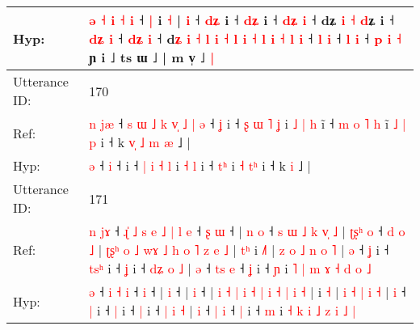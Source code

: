 \documentclass[10pt]{article}
\DeclareRobustCommand{\hl}[1]{{\textcolor{red}{#1}}}
\begin{document}
\begin{longtable}{ll}
 \\
Hyp: & \hl{}\hl{}\hl{}\hl{}\hl{}\hl{}\hl{}\hl{}\hl{ə} \hl{˧} \hl{i} \hl{˧} \hl{i} ˧ \hl{|} i \hl{˧} |\hl{}\hl{} \hl{i} ˧ \hl{}\hl{d}\hl{ʑ} i ˧ \hl{d}\hl{ʑ} i\hl{} ˧ \hl{}\hl{d}\hl{ʑ} \hl{i} ˧ dʑ\hl{}\hl{}\hl{}\hl{} \hl{i} \hl{˧} \hl{}\hl{d}ʑ i\hl{}\hl{}\hl{}\hl{} ˧ \hl{d}\hl{ʑ} \hl{}\hl{i} ˧\hl{}\hl{}\hl{}\hl{}\hl{}\hl{}\hl{} \hl{}\hl{d}\hl{ʑ} \hl{i} ˧ d\hl{}\hl{ʑ} \hl{i} \hl{}\hl{}\hl{˧} \hl{l} \hl{i} \hl{˧} \hl{l} \hl{i} \hl{}\hl{˧} \hl{l} \hl{i} \hl{˧} \hl{l} \hl{i} ˧\hl{}\hl{} \hl{l} \hl{i} ˧ \hl{}\hl{l} \hl{i} ˧ \hl{}\hl{p} \hl{i} \hl{˧} ɲ i ˩ ts ɯ ˩ | m v̩ ˩\hl{ }\hl{|}
 \\
\midrule
Utterance ID: & 170 \\
Ref: & \hl{n}\hl{ }\hl{j}\hl{æ} ˧\hl{ }\hl{s}\hl{ }\hl{ɯ}\hl{ }\hl{˩}\hl{ }\hl{k}\hl{ }\hl{v}\hl{̩}\hl{ }\hl{˩}\hl{ }\hl{|} \hl{ə} ˧\hl{ }\hl{ʝ} i ˧ \hl{ʂ} \hl{ɯ} \hl{˥} \hl{ʝ} i\hl{ }\hl{˩} \hl{|} \hl{h} i\hl{̃} ˧\hl{ }\hl{m}\hl{ }\hl{o} \hl{˥}\hl{ }\hl{h} i\hl{̃} \hl{˩} \hl{|}\hl{ }\hl{p} i ˧ k\hl{ }\hl{v}\hl{̩}\hl{ }\hl{˩}\hl{ }\hl{m} \hl{æ} ˩ |
 \\
Hyp: & \hl{}\hl{}\hl{}\hl{ə} ˧\hl{}\hl{}\hl{}\hl{}\hl{}\hl{}\hl{}\hl{}\hl{}\hl{}\hl{}\hl{}\hl{}\hl{}\hl{} \hl{i} ˧\hl{}\hl{} i ˧ \hl{|} \hl{i} \hl{˧} \hl{l} i\hl{}\hl{} \hl{˧} \hl{l} i\hl{} ˧\hl{}\hl{}\hl{}\hl{} \hl{}\hl{t}\hl{ʰ} i\hl{} \hl{˧} \hl{}\hl{t}\hl{ʰ} i ˧ k\hl{}\hl{}\hl{}\hl{}\hl{}\hl{}\hl{} \hl{i} ˩ |
 \\
\midrule
Utterance ID: & 171 \\
Ref: & \hl{n}\hl{ }\hl{j}\hl{ɤ} ˧\hl{ }\hl{ɻ}\hl{̍}\hl{ }\hl{˩}\hl{ }\hl{s}\hl{ }\hl{e}\hl{ }\hl{˩} \hl{|} \hl{l} \hl{e} ˧\hl{ }\hl{ʂ} \hl{ɯ} ˧ |\hl{ }\hl{n} \hl{o} ˧\hl{ }\hl{s}\hl{ }\hl{ɯ}\hl{ }\hl{˩}\hl{ }\hl{k}\hl{ }\hl{v}\hl{̩}\hl{ }\hl{˩} |\hl{ }\hl{ʈ}\hl{ʂ}\hl{ʰ} \hl{o} ˧\hl{ }\hl{d}\hl{ }\hl{o}\hl{ }\hl{˩} | \hl{ʈ}\hl{ʂ}\hl{ʰ} \hl{o} \hl{˩} \hl{w}\hl{ɤ} \hl{˩} \hl{h} \hl{o} \hl{˥} \hl{z} \hl{e} \hl{˩} |\hl{ }\hl{t}\hl{ʰ} i \hl{˩}\hl{˥} |\hl{ }\hl{z} \hl{o} \hl{˩} \hl{n} \hl{o} \hl{˥} | \hl{ə} ˧ \hl{ʝ} i ˧ \hl{t}\hl{s}\hl{ʰ} i ˧ \hl{ʝ} i ˧ \hl{d}\hl{ʑ} \hl{o} \hl{˩} | \hl{ə} ˧ \hl{t}\hl{s} \hl{e} ˧ \hl{ʝ} i ˧ \hl{ɲ} i \hl{˥} \hl{|} \hl{m} \hl{ɤ} \hl{˧} \hl{d} \hl{o} \hl{˩}
 \\
Hyp: & \hl{}\hl{}\hl{}\hl{ə} ˧\hl{}\hl{}\hl{}\hl{}\hl{}\hl{}\hl{}\hl{}\hl{}\hl{}\hl{} \hl{i} \hl{˧} \hl{i} ˧\hl{}\hl{} \hl{i} ˧ |\hl{}\hl{} \hl{i} ˧\hl{}\hl{}\hl{}\hl{}\hl{}\hl{}\hl{}\hl{}\hl{}\hl{}\hl{}\hl{}\hl{} |\hl{}\hl{}\hl{}\hl{} \hl{i} ˧\hl{}\hl{}\hl{}\hl{}\hl{}\hl{} | \hl{}\hl{}\hl{i} \hl{˧} \hl{|} \hl{}\hl{i} \hl{˧} \hl{|} \hl{i} \hl{˧} \hl{|} \hl{i} \hl{˧} |\hl{}\hl{}\hl{} i \hl{}\hl{˧} |\hl{}\hl{} \hl{i} \hl{˧} \hl{|} \hl{i} \hl{˧} | \hl{i} ˧ \hl{|} i ˧ \hl{}\hl{}\hl{|} i ˧ \hl{|} i ˧ \hl{}\hl{|} \hl{i} \hl{˧} | \hl{i} ˧ \hl{}\hl{|} \hl{i} ˧ \hl{|} i ˧ \hl{m} i \hl{˧} \hl{k} \hl{i} \hl{˩} \hl{z} \hl{i} \hl{˩} \hl{|}

\end{longtable}
\end{document}
